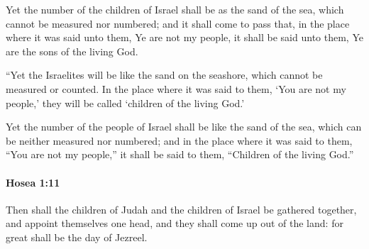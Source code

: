 			\begin{versebox}
					\item[BHS] 
					\item[LXX] 
					\item[ASV] Yet the number of the children of Israel shall be as the sand of the sea, which cannot be measured nor numbered; and it shall come to pass that, in the place where it was said unto them, Ye are not my people, it shall be said unto them, Ye are the sons of the living God.
					\item[NIV] “Yet the Israelites will be like the sand on the seashore, which cannot be measured or counted. In the place where it was said to them, ‘You are not my people,’ they will be called ‘children of the living God.’
					\item[NRSV] Yet the number of the people of Israel shall be like the sand of the sea, which can be neither measured nor numbered; and in the place where it was said to them, “You are not my people,” it shall be said to them, “Children of the living God.”
			\end{versebox}

		\paragraph{Hosea 1:11} %
			\label{HOSEA-1-11}

			Then shall the children of Judah and the children of Israel be gathered together, and appoint themselves one head, and they shall come up out of the land: for great shall be the day of Jezreel.

